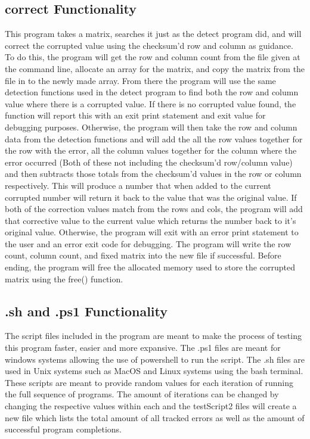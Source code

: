 \documentclass{article}
\begin{document}
\begin{multicols}{2}
    \subsection{correct Functionality}\label{subsec:correctFunc}
    This program takes a matrix, searches it just as the detect program did, and will correct the corrupted value using the checksum'd row and column as guidance. To do this,
    the program will get the row and column count from the file given at the command line, allocate an array for the matrix, and copy the matrix from the file in to the
    newly made array. From there the program will use the same detection functions used in the detect program to find both the row and column value where there is a corrupted
    value. If there is no corrupted value found, the function will report this with an exit print statement and exit value for debugging purposes. Otherwise, the program will
    then take the row and column data from the detection functions and will add the all the row values together for the row with the error, all the column values together for
    the column where the error occurred (Both of these not including the checksum'd row/column value) and then subtracts those totals from the checksum'd values in the row or column
    respectively. This will produce a number that when added to the current corrupted number will return it back to the value that was the original value. If both of the correction
    values match from the rows and cols, the program will add that corrective value to the current value which returns the number back to it's original value. Otherwise, the
    program will exit with an error print statement to the user and an error exit code for debugging. The program will write the row count, column count, and fixed matrix into
    the new file if successful. Before ending, the program will free the allocated memory used to store the corrupted matrix using the free() function.
    \subsection{.sh and .ps1 Functionality}\label{subsec:shPs1Func}
    The script files included in the program are meant to make the process of testing this program faster, easier and more expansive. The .ps1 files are meant for windows systems
    allowing the use of powershell to run the script. The .sh files are used in Unix systems such as MacOS and Linux systems using the bash terminal. These scripts are meant to provide
    random values for each iteration of running the full sequence of programs. The amount of iterations can be changed by changing the respective values within each and the
    testScript2 files will create a new file which lists the total amount of all tracked errors as well as the amount of successful program completions. 


\end{multicols}
\end{document}
